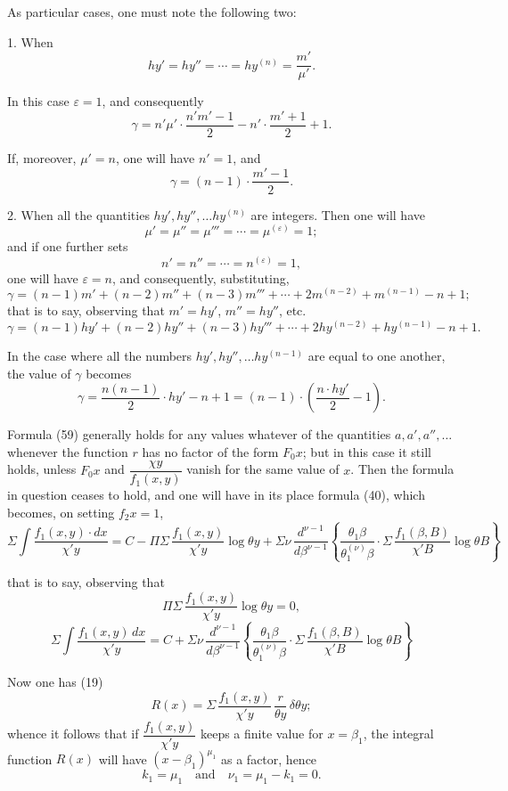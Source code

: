 \documentclass{article}
\begin{document}
As particular cases, one must note the following two:

1. When
\[ hy' = hy'' = \cdots = hy^{(n)} = \frac{m'}{\mu'}. \]

In this case $\varepsilon = 1$, and consequently
\[ \gamma = n'\mu' \cdot \frac{n'm'-1}{2} - n' \cdot \frac{m'+1}{2} + 1. \tag{63} \]

If, moreover, $\mu' = n$, one will have $n' = 1$, and
\[ \gamma = (n-1) \cdot \frac{m'-1}{2}. \tag{64} \]

2. When all the quantities $hy', hy'', \ldots hy^{(n)}$ are integers. Then one will have
\[ \mu' = \mu'' = \mu''' = \cdots = \mu^{(\varepsilon)} = 1; \]
and if one further sets
\[ n' = n'' = \cdots = n^{(\varepsilon)} = 1, \]
one will have $\varepsilon = n$, and consequently, substituting,
\[ \gamma = (n-1)m' + (n-2)m'' + (n-3)m''' + \cdots + 2m^{(n-2)} + m^{(n-1)} - n + 1; \]
that is to say, observing that $m' = hy'$, $m'' = hy''$, etc.
\[ \gamma = (n-1)hy' + (n-2)hy'' + (n-3)hy''' + \cdots + 2hy^{(n-2)} + hy^{(n-1)} - n + 1. \tag{66} \]

In the case where all the numbers $hy', hy'', \ldots hy^{(n-1)}$ are equal to one another, the value of $\gamma$ becomes
\[ \gamma = \frac{n(n-1)}{2} \cdot hy' - n + 1 = (n-1) \cdot \left( \frac{n \cdot hy'}{2} - 1 \right). \tag{67} \]

Formula (59) generally holds for any values whatever of the quantities $a, a', a'', \ldots$ whenever the function $r$ has no factor of the form $F_0 x$; but in this case it still holds, unless $F_0 x$ and $\dfrac{\chi y}{f_1(x,y)}$ vanish for the same value of $x$. Then the formula in question ceases to hold, and one will have in its place formula (40), which becomes, on setting $f_2 x = 1$,
\[ \Sigma\int \frac{f_1(x, y) \cdot dx}{\chi' y} = C - \Pi\Sigma\,\frac{f_1(x, y)}{\chi' y}\log\theta y + \Sigma\nu\,\frac{d^{\nu-1}}{d\beta^{\nu-1}} \left\{ \frac{\theta_1\beta}{\theta_1^{(\nu)}\beta} \cdot \Sigma\,\frac{f_1(\beta, B)}{\chi' B}\log\theta B \right\} \tag{68} \]

that is to say, observing that
\[ \Pi\Sigma\,\frac{f_1(x, y)}{\chi' y}\log\theta y = 0, \]
\[ \Sigma\int \frac{f_1(x, y)\,dx}{\chi' y} = C + \Sigma\nu\,\frac{d^{\nu-1}}{d\beta^{\nu-1}} \left\{ \frac{\theta_1\beta}{\theta_1^{(\nu)}\beta} \cdot \Sigma\,\frac{f_1(\beta, B)}{\chi' B}\log\theta B \right\} \tag{69} \]

Now one has (19)
\[ R(x) = \Sigma\,\frac{f_1(x, y)}{\chi' y}\,\frac{r}{\theta y}\,\delta\theta y; \]
whence it follows that if $\dfrac{f_1(x,y)}{\chi' y}$ keeps a finite value for $x = \beta_1$, the integral function $R(x)$ will have $(x-\beta_1)^{\mu_1}$ as a factor, hence
\[ k_1 = \mu_1 \quad \text{and} \quad \nu_1 = \mu_1 - k_1 = 0. \]
\end{document}
